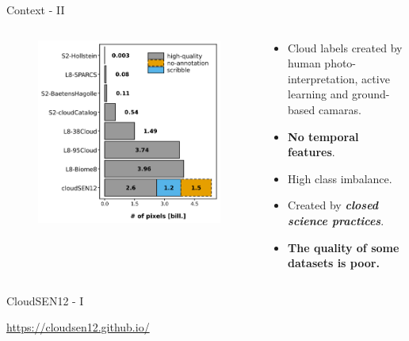 \begin{frame}{Context - II}
	\begin{columns}
		\begin{column}{0.5\textwidth}
			\begin{figure}
				\includegraphics[width=\textwidth]{images/intro_fig02.png}
				\label{fig:introfig02}
			\end{figure}	
		\end{column}
		\begin{column}{0.5\textwidth}
			\begin{itemize}[<+->]
				\item Cloud labels created by human photo-interpretation, active learning and ground-based camaras.
				\item \textbf{No temporal features}.
				\item High class imbalance.
				\item Created by \textbf{\textit{closed science practices}}.
				\item \textbf{The quality of some datasets is poor.}
			\end{itemize}
		\end{column}
	\end{columns}
\end{frame}


\begin{frame}{CloudSEN12 - I}
	\begin{center}
		\begin{figure}
		\end{figure}		
	\textcolor{blue}{\href{https://cloudsen12.github.io/}{https://cloudsen12.github.io/}}
	\end{center}
\end{frame}


